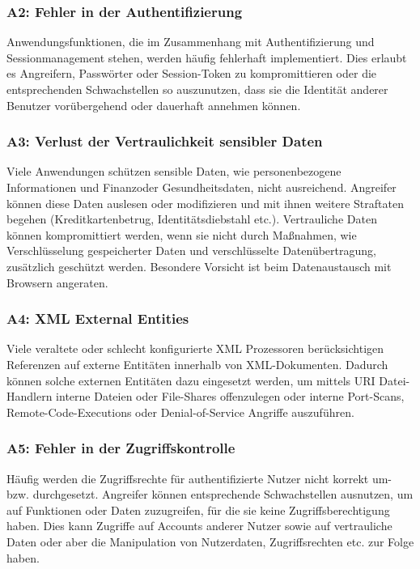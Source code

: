 \documentclass[12pt,oneside,a4paper,parskip]{scrbook}
\begin{document}
    \subsubsection{A2: Fehler in der Authentifizierung}
    Anwendungsfunktionen, die im Zusammenhang mit Authentifizierung und Sessionmanagement
    stehen, werden häufig fehlerhaft implementiert. Dies erlaubt es Angreifern, Passwörter oder
    Session-Token zu kompromittieren oder die entsprechenden Schwachstellen so auszunutzen,
    dass sie die Identität anderer Benutzer vorübergehend oder dauerhaft annehmen können.

    \subsubsection{A3: Verlust der Vertraulichkeit sensibler Daten}
    Viele Anwendungen schützen sensible Daten, wie personenbezogene Informationen und Finanzoder
    Gesundheitsdaten, nicht ausreichend. Angreifer können diese Daten auslesen oder
    modifizieren und mit ihnen weitere Straftaten begehen (Kreditkartenbetrug, Identitätsdiebstahl
    etc.). Vertrauliche Daten können kompromittiert werden, wenn sie nicht durch Maßnahmen, wie
    Verschlüsselung gespeicherter Daten und verschlüsselte Datenübertragung, zusätzlich geschützt
    werden. Besondere Vorsicht ist beim Datenaustausch mit Browsern angeraten.

    \subsubsection{A4: XML External Entities}
    Viele veraltete oder schlecht konfigurierte XML Prozessoren berücksichtigen Referenzen auf
    externe Entitäten innerhalb von XML-Dokumenten. Dadurch können solche externen Entitäten
    dazu eingesetzt werden, um mittels URI Datei-Handlern interne Dateien oder File-Shares offenzulegen
    oder interne Port-Scans, Remote-Code-Executions oder Denial-of-Service Angriffe
    auszuführen.

    \subsubsection{A5: Fehler in der Zugriffskontrolle}
    Häufig werden die Zugriffsrechte für authentifizierte Nutzer nicht korrekt um- bzw. durchgesetzt.
    Angreifer können entsprechende Schwachstellen ausnutzen, um auf Funktionen oder Daten
    zuzugreifen, für die sie keine Zugriffsberechtigung haben. Dies kann Zugriffe auf Accounts
    anderer Nutzer sowie auf vertrauliche Daten oder aber die Manipulation von Nutzerdaten,
    Zugriffsrechten etc. zur Folge haben.
\end{document}
